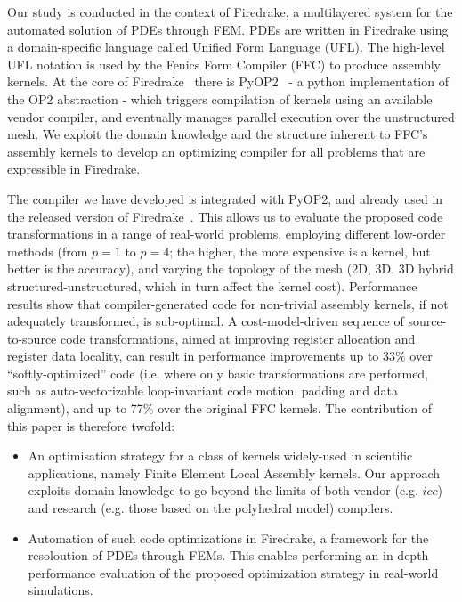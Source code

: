 \documentclass[conference]{IEEEtran}
\begin{document}
Our study is conducted in the context of Firedrake, a multilayered system for the automated solution of PDEs through FEM. PDEs are written in Firedrake using a domain-specific language called Unified Form Language (UFL). The high-level UFL notation is used by the Fenics Form Compiler (FFC) to produce assembly kernels. At the core of Firedrake~\cite{firedrake} there is PyOP2~\cite{pyop2ics} - a python implementation of the OP2 abstraction - which triggers compilation of kernels using an available vendor compiler, and eventually manages parallel execution over the unstructured mesh. We exploit the domain knowledge and the structure inherent to FFC's assembly kernels to develop an optimizing compiler for all problems that are expressible in Firedrake. 

The compiler we have developed is integrated with PyOP2, and already used in the released version of Firedrake~\cite{firedrake-code}. This allows us to evaluate the proposed code transformations in a range of real-world problems, employing different low-order methods (from $p=1$ to $p=4$; the higher, the more expensive is a kernel, but better is the accuracy), and varying the topology of the mesh (2D, 3D, 3D hybrid structured-unstructured, which in turn affect the kernel cost). Performance results show that compiler-generated code for non-trivial assembly kernels, if not adequately transformed, is sub-optimal. A cost-model-driven sequence of source-to-source code transformations, aimed at improving register allocation and register data locality, can result in performance improvements up to 33$\%$ over ``softly-optimized'' code (i.e. where only basic transformations are performed, such as auto-vectorizable loop-invariant code motion, padding and data alignment), and up to 77$\%$ over the original FFC kernels. The contribution of this paper is therefore twofold:
\begin{itemize}
\item An optimisation strategy for a class of kernels widely-used in scientific applications, namely Finite Element Local Assembly kernels. Our approach exploits domain knowledge to go beyond the limits of both vendor (e.g. $icc$) and research (e.g. those based on the polyhedral model) compilers.
\item Automation of such code optimizations in Firedrake, a framework for the resoloution of PDEs through FEMs. This enables performing an in-depth performance evaluation of the proposed optimization strategy in real-world simulations.
\end{itemize}
\end{document}
